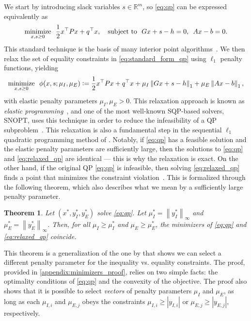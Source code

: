 \documentclass{article} %
\def\sR{{\mathbb{R}}}
\DeclareMathOperator*{\minimize}{minimize}
\DeclareMathOperator*{\st}{subject\ to}
\newcommand{\norm}[1]{\left\lVert#1\right\rVert}
\newcommand{\defeq}{\vcentcolon=}
\newcommand{\hquad}{\hspace{0.5em}}
\newtheorem{theorem}{Theorem}[section]
\begin{document}
We start by introducing slack variables $s \in \sR^m$, so \cref{eq:qp} can be expressed equivalently as
\begin{equation}
    \minimize_{x, s \geq 0} \hquad \frac{1}{2} x^\top P x + q^\top x, \quad \st \hquad Gx + s - h = 0, \hquad Ax - b = 0. \label{eq:standard_form_qp}
\end{equation}
This standard technique is the basis of many interior point algorithms~\citep{nocedal2006numerical}.
We then relax the set of equality constraints in \cref{eq:standard_form_qp} using $\ell_1$ penalty functions, yielding
\begin{equation}
    \minimize_{x, s \geq 0} \hquad \phi(x, s; \mu_I, \mu_E) \defeq \frac{1}{2} x^\top P x + q^\top x + \mu_I \norm{Gx + s - h}_1 + \mu_E \norm{Ax - b}_1, \label{eq:relaxed_qp}
\end{equation}
with elastic penalty parameters $\mu_I, \mu_E > 0$. This relaxation approach is known as \textit{elastic programming}~\citep{brown1975elastic}, and one of the most well-known SQP-based solvers, SNOPT, uses this technique in order to reduce the infeasibility of a QP subproblem~\citep{gill2005snopt}. This relaxation is also a fundamental step in the sequential $\ell_1$ quadratic programming method of \citet{fletcher1985l1}.
Notably, if \cref{eq:qp} has a feasible solution and the elastic penalty parameters are sufficiently large, then the solutions to \cref{eq:qp} and \cref{eq:relaxed_qp} are identical --- this is why the relaxation is exact.
On the other hand, if the original QP \cref{eq:qp} is infeasible, then solving \cref{eq:relaxed_qp} finds a point that minimizes the constraint violation~\citep{nocedal2006numerical}. This is formalized through the following theorem, which also describes what we mean by a sufficiently large penalty parameter.

\begin{theorem} \label{thm:minimizers}
    Let $(x^*, y_I^*, y_E^*)$ solve \cref{eq:qp}. Let $\mu_I^* = \norm{y_I^*}_\infty$ and $\mu_E^* = \norm{y_E^*}_\infty$. Then, for all $\mu_I \geq \mu_I^*$ and $\mu_E \geq \mu_E^*$, the minimizers of \cref{eq:qp} and \cref{eq:relaxed_qp} coincide.
\end{theorem}

This theorem is a generalization of the one by \citet{han1979exact} that shows we can select a different penalty parameter for the inequality vs. equality constraints. The proof, provided in \cref{appendix:minimizers_proof}, relies on two simple facts: the optimality conditions of \cref{eq:qp} and the convexity of the objective. The proof also shows that it is possible to select \emph{vectors} of penalty parameters $\mu_I$ and $\mu_E$, as long as each $\mu_{I,i}$ and $\mu_{E,j}$ obeys the constraints $\mu_{I,{i}} \geq |y_{I,i}|$ or $\mu_{E,j} \geq |y_{E,j}|$, respectively.
\end{document}
